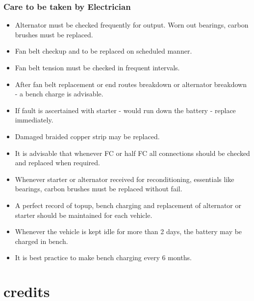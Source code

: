 \documentclass{beamer}
\begin{document}
\begin{frame}
  \frametitle{Care to be taken by Electrician}
  \fontsize{8pt}{10}\selectfont
  \begin{itemize}
    \item Alternator must be checked frequently for output. Worn out bearings, carbon brushes must be replaced.
    \item Fan belt checkup and to be replaced on scheduled manner.
    \item Fan belt tension must be checked in frequent intervals.
    \item After fan belt replacement or end routes breakdown or alternator breakdown - a bench charge is advisable.
    \item If fault is ascertained with starter - would run down the battery - replace immediately.
    \item Damaged braided copper strip may be replaced.
    \item It is advisable that whenever FC or half FC all connections should be checked and replaced when required.
    \item Whenever starter or alternator received for reconditioning, essentials like bearings, carbon brushes must be replaced without fail.
    \item A perfect record of topup, bench charging and replacement of alternator or starter should be maintained for each vehicle.
    \item Whenever the vehicle is kept idle for more than 2 days, the battery may be charged in bench.
    \item It is best practice to make bench charging every 6 months.
  \end{itemize}
\end{frame}




\section{credits}
\end{document}
